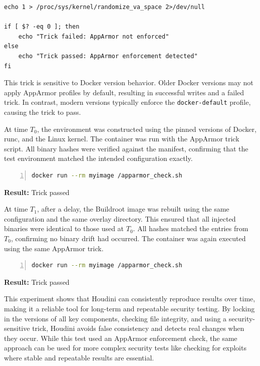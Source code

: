 \documentclass[12pt]{report}
\begin{document}
\begin{doublespace}
\begin{lstlisting}
echo 1 > /proc/sys/kernel/randomize_va_space 2>/dev/null

if [ $? -eq 0 ]; then
    echo "Trick failed: AppArmor not enforced"
else
    echo "Trick passed: AppArmor enforcement detected"
fi
\end{lstlisting}

This trick is sensitive to Docker version behavior. Older Docker versions may not apply AppArmor profiles by default, resulting in successful writes and a failed trick. In contrast, modern versions typically enforce the \texttt{docker-default} profile, causing the trick to pass.


At time \( T_0 \), the environment was constructed using the pinned versions of Docker, runc, and the Linux kernel. The container was run with the AppArmor trick script. All binary hashes were verified against the manifest, confirming that the test environment matched the intended configuration exactly. 

\begin{lstlisting}[language=bash, caption={Running the AppArmor Trick in a Container}, label={lst:run-apparmor-trick}, numbers=left, numberstyle=\tiny, stepnumber=1, frame=single, breaklines=true, backgroundcolor=\color{gray!10}, basicstyle=\ttfamily\footnotesize, showspaces=false, showstringspaces=false]
docker run --rm myimage /apparmor_check.sh
\end{lstlisting}

\noindent\textbf{Result:} Trick passed


At time \( T_1 \), after a delay, the Buildroot image was rebuilt using the same configuration and the same overlay directory. This ensured that all injected binaries were identical to those used at \( T_0 \). All hashes matched the entries from \( T_0 \), confirming no binary drift had occurred. The container was again executed using the same AppArmor trick.

\begin{lstlisting}[language=bash, caption={Running the AppArmor Trick in a Container (\( T_1 \))}, label={lst:run-apparmor-trick-t1}, numbers=left, numberstyle=\tiny, stepnumber=1, frame=single, breaklines=true, backgroundcolor=\color{gray!10}, basicstyle=\ttfamily\footnotesize, showspaces=false, showstringspaces=false]
docker run --rm myimage /apparmor_check.sh
\end{lstlisting}

\noindent\textbf{Result:} Trick passed

This experiment shows that Houdini can consistently reproduce results over time, making it a reliable tool for long-term and repeatable security testing. By locking in the versions of all key components, checking file integrity, and using a security-sensitive trick, Houdini avoids false consistency and detects real changes when they occur. While this test used an AppArmor enforcement check, the same approach can be used for more complex security tests like checking for exploits where stable and repeatable results are essential.


\end{doublespace}
\end{document}
